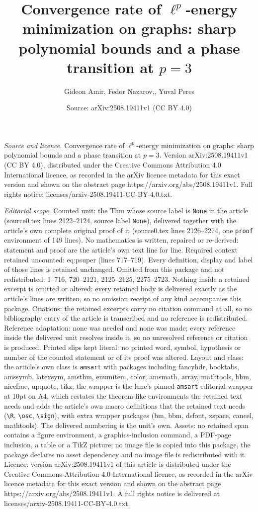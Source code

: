 \documentclass[10pt,a4paper]{amsart}
\title[Convergence rate of $\ell^p$-energy minimization on graphs: ]{Convergence rate of $\ell^p$-energy minimization on graphs: sharp polynomial bounds and a phase transition at $p=3$}
\author{Gideon Amir, Fedor Nazarov,, Yuval Peres}
\date{Source: arXiv:2508.19411v1 (CC BY 4.0)}
\begin{document}
\maketitle

\noindent\emph{Source and licence.} Convergence rate of $\ell^p$-energy minimization on graphs: sharp polynomial bounds and a phase transition at $p=3$. Version arXiv:2508.19411v1 (CC BY 4.0), distributed under the Creative Commons Attribution 4.0 International licence, as recorded in the arXiv licence metadata for this exact version and shown on the abstract page https://arxiv.org/abs/2508.19411v1. Full rights notice: licenses/arxiv-2508.19411-CC-BY-4.0.txt.\par\smallskip

\noindent\textit{Editorial scope.} Counted unit: the Thm whose source label is \texttt{None} in the article (source0.tex lines 2122--2124, source label \texttt{None}), delivered together with the article's own complete original proof of it (source0.tex lines 2126--2274, one \texttt{proof} environment of 149 lines). No mathematics is written, repaired or re-derived: statement and proof are the article's own text line for line. Required context retained uncounted: eq:psuper (lines 717--719). Every definition, display and label of those lines is retained unchanged. Omitted from this package and not redistributed: 1--716, 720--2121, 2125--2125, 2275--2723. Nothing inside a retained excerpt is omitted or altered: every retained body is delivered exactly as the article's lines are written, so no omission receipt of any kind accompanies this package. Citations: the retained excerpts carry no citation command at all, so no bibliography entry of the article is transcribed and no reference is redistributed. Reference adaptation: none was needed and none was made; every reference inside the delivered unit resolves inside it, so no unresolved reference or citation is produced. Printed slips kept literal: no printed word, symbol, hypothesis or number of the counted statement or of its proof was altered. Layout and class: the article's own class is \texttt{amsart} with packages including fancyhdr, booktabs, amssymb, latexsym, amsthm, enumitem, color, amsmath, array, mathtools, bbm, nicefrac, upquote, tikz; the wrapper is the lane's pinned \texttt{amsart} editorial wrapper at 10pt on A4, which restates the theorem-like environments the retained text needs and adds the article's own macro definitions that the retained text needs (\texttt{\textbackslash R}, \texttt{\textbackslash osc}, \texttt{\textbackslash sign}), with extra wrapper packages (bm, bbm, dsfont, xspace, cancel, mathtools). The delivered numbering is the unit's own. Assets: no retained span contains a figure environment, a graphics-inclusion command, a PDF-page inclusion, a table or a TikZ picture; no image file is copied into this package, the package declares no asset dependency and no image file is redistributed with it. Licence: version arXiv:2508.19411v1 of this article is distributed under the Creative Commons Attribution 4.0 International licence, as recorded in the arXiv licence metadata for this exact version and shown on the abstract page https://arxiv.org/abs/2508.19411v1. A full rights notice is delivered at licenses/arxiv-2508.19411-CC-BY-4.0.txt. 
\end{document}
